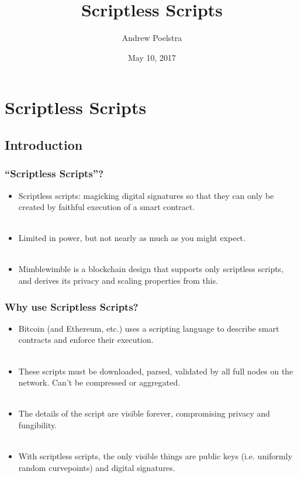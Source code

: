 \documentclass{beamer}
\title{Scriptless Scripts}
\author{Andrew Poelstra}
\institute{\texttt{grindelwald@wpsoftware.net}}
\date{May 10, 2017}
\begin{document}
\frame{ \maketitle }

\section{Scriptless Scripts}  %

\subsection{Introduction}
\frame
{
  \frametitle{``Scriptless Scripts''?}
  \begin{itemize}
  \item Scriptless scripts: magicking digital signatures so that they can only
        be created by faithful execution of a smart contract.\\~\\
  \item Limited in power, but not nearly as much as you might expect.\\~\\
  \item Mimblewimble is a blockchain design that supports only scriptless scripts,
        and derives its privacy and scaling properties from this.
  \end{itemize}
}

\frame
{
  \frametitle{Why use Scriptless Scripts?}
  \begin{itemize}
  \item Bitcoin (and Ethereum, etc.) uses a scripting language to describe smart
        contracts and enforce their execution.\\~\\
  \item These scripts must be downloaded, parsed, validated by all full nodes on
        the network. Can't be compressed or aggregated.\\~\\
  \item The details of the script are visible forever, compromising privacy and
        fungibility.\\~\\
  \item With scriptless scripts, the only visible things are public keys (i.e.
        uniformly random curvepoints) and digital signatures.\\~\\
  \end{itemize}
}
\end{document}
